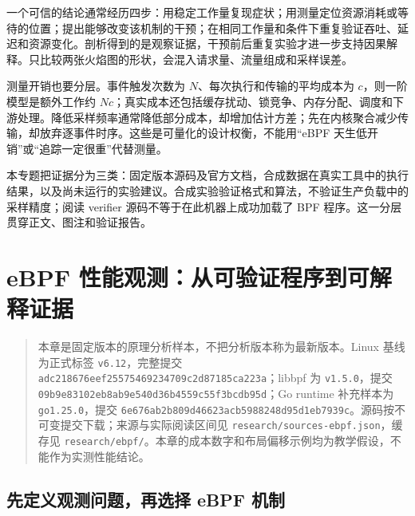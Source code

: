 \documentclass[UTF8,fontset=fandol,openany,11pt]{ctexbook}
\begin{document}
一个可信的结论通常经历四步：用稳定工作量复现症状；用测量定位资源消耗或等待的位置；提出能够改变该机制的干预；在相同工作量和条件下重复验证吞吐、延迟和资源变化。剖析得到的是观察证据，干预前后重复实验才进一步支持因果解释。只比较两张火焰图的形状，会混入请求量、流量组成和采样误差。\cite{pp-diff}\cite{pp-total}


测量开销也要分层。事件触发次数为 \(N\)、每次执行和传输的平均成本为 \(c\)，则一阶模型是额外工作约 \(Nc\)；真实成本还包括缓存扰动、锁竞争、内存分配、调度和下游处理。降低采样频率通常降低部分成本，却增加估计方差；先在内核聚合减少传输，却放弃逐事件时序。这些是可量化的设计权衡，不能用“eBPF 天生低开销”或“追踪一定很重”代替测量。


本专题把证据分为三类：固定版本源码及官方文档，合成数据在真实工具中的执行结果，以及尚未运行的实验建议。合成实验验证格式和算法，不验证生产负载中的采样精度；阅读 verifier 源码不等于在此机器上成功加载了 BPF 程序。这一分层贯穿正文、图注和验证报告。


\chapter{eBPF 性能观测：从可验证程序到可解释证据}
\label{ch:18}


\begin{quote}本章是固定版本的原理分析样本，不把分析版本称为最新版本。Linux 基线为正式标签 \texttt{v6.\allowbreak{}12}，完整提交 \texttt{adc21867\allowbreak{}6eef2557\allowbreak{}54692347\allowbreak{}09c2d871\allowbreak{}85ca223a}；libbpf 为 \texttt{v1.\allowbreak{}5.\allowbreak{}0}，提交 \texttt{09b9e831\allowbreak{}02eb8ab9\allowbreak{}e540d36b\allowbreak{}4559c55f\allowbreak{}3bcdb95d}；Go runtime 补充样本为 \texttt{go1.\allowbreak{}25.\allowbreak{}0}，提交 \texttt{6e676ab2\allowbreak{}b809d466\allowbreak{}23acb598\allowbreak{}8248d95d\allowbreak{}1eb7939c}。源码按不可变提交下载；来源与实际阅读区间见 \texttt{research/\allowbreak{}sources-\allowbreak{}ebpf.\allowbreak{}json}，缓存见 \texttt{research/\allowbreak{}ebpf/\allowbreak{}}。本章的成本数字和布局偏移示例均为教学假设，不能作为实测性能结论。

\end{quote}

\section{先定义观测问题，再选择 eBPF 机制}
\end{document}
